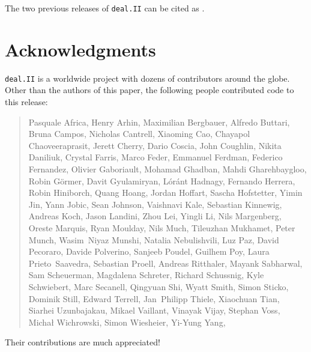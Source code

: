 \documentclass{ansarticle-preprint}
\newcommand{\specialword}[1]{\texttt{#1}}
\newcommand{\dealii}{{\specialword{deal.II}}\xspace}
\begin{document}
The two previous releases of \dealii can be cited as
\cite{dealII95,dealII96}.


\section{Acknowledgments}

\dealii is a worldwide project with dozens of contributors around the
globe. Other than the authors of this paper, the following people
contributed code to this release:\\

\begin{quote}
Pasquale     Africa,
Henry        Arhin,
Maximilian   Bergbauer,
Alfredo      Buttari,
Bruna        Campos,
Nicholas     Cantrell,
Xiaoming     Cao,
Chayapol     Chaoveeraprasit,
Jerett       Cherry,
Dario        Coscia,
John         Coughlin,
Nikita       Daniliuk,
Crystal      Farris,
Marco        Feder,
Emmanuel     Ferdman,
Federico     Fernandez,
Olivier      Gaboriault,
Mohamad      Ghadban,
Mahdi        Gharehbaygloo,
Robin        Görmer,
Davit        Gyulamiryan,
Lóránt       Hadnagy,
Fernando     Herrera,
Robin        Hiniborch,
Quang        Hoang,
Jordan       Hoffart,
Sascha       Hofstetter,
Yimin        Jin,
Yann         Jobic,
Sean         Johnson,
Vaishnavi    Kale,
Sebastian    Kinnewig,
Andreas      Koch,
Jason        Landini,
Zhou         Lei,
Yingli       Li,
Nils         Margenberg,
Oreste       Marquis,
Ryan         Moulday,
Nils         Much,
Tileuzhan    Mukhamet,
Peter        Munch,
Wasim~Niyaz  Munshi,
Natalia      Nebulishvili,
Luz          Paz,
David        Pecoraro,
Davide       Polverino,
Sanjeeb      Poudel,
Guilhem      Poy,
Laura        Prieto~Saavedra,
Sebastian    Proell,
Andreas      Ritthaler,
Mayank       Sabharwal,
Sam          Scheuerman,
Magdalena    Schreter,
Richard      Schussnig,
Kyle         Schwiebert,
Marc         Secanell,
Qingyuan     Shi,
Wyatt        Smith,
Simon        Sticko,
Dominik      Still,
Edward       Terrell,
Jan~Philipp  Thiele,
Xiaochuan    Tian,
Siarhei      Uzunbajakau,
Mikael       Vaillant,
Vinayak      Vijay,
Stephan      Voss,
Michał       Wichrowski,
Simon        Wiesheier,
Yi-Yung      Yang,
\end{quote}
Their contributions are much appreciated!
\end{document}
